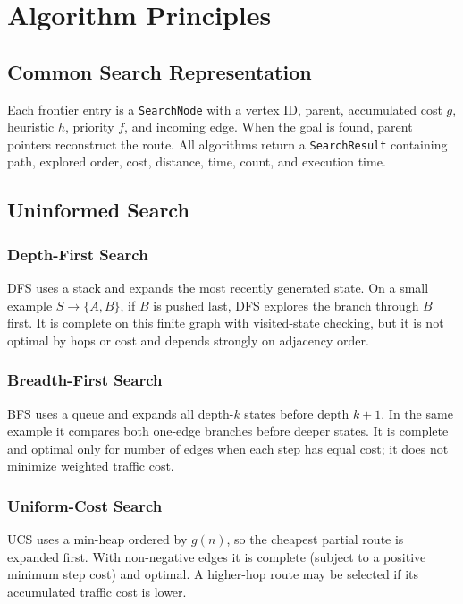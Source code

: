 \documentclass[12pt,a4paper,oneside]{report}
\newcommand{\code}[1]{\texttt{#1}}
\begin{document}
\chapter{Algorithm Principles}

\section{Common Search Representation}
Each frontier entry is a \code{SearchNode} with a vertex ID, parent, accumulated
cost $g$, heuristic $h$, priority $f$, and incoming edge. When the goal is found,
parent pointers reconstruct the route. All algorithms return a
\code{SearchResult} containing path, explored order, cost, distance, time, count,
and execution time.

\section{Uninformed Search}
\subsection{Depth-First Search}
DFS uses a stack and expands the most recently generated state. On a small
example $S\rightarrow\{A,B\}$, if $B$ is pushed last, DFS explores the branch
through $B$ first. It is complete on this finite graph with visited-state
checking, but it is not optimal by hops or cost and depends strongly on
adjacency order.

\subsection{Breadth-First Search}
BFS uses a queue and expands all depth-$k$ states before depth $k+1$. In the
same example it compares both one-edge branches before deeper states. It is
complete and optimal only for number of edges when each step has equal cost;
it does not minimize weighted traffic cost.

\subsection{Uniform-Cost Search}
UCS uses a min-heap ordered by $g(n)$, so the cheapest partial route is expanded
first. With non-negative edges it is complete (subject to a positive minimum
step cost) and optimal. A higher-hop route may be selected if its accumulated
traffic cost is lower.
\end{document}
